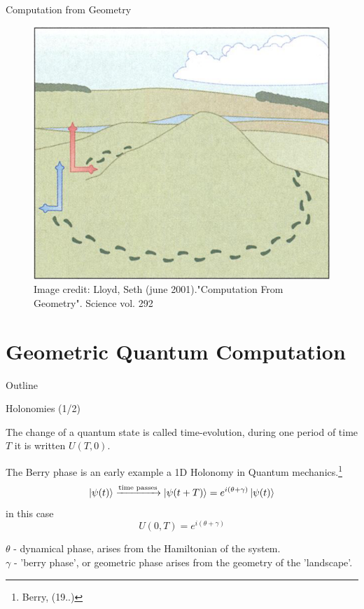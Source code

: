 \documentclass[t]{beamer}
\begin{document}
\begin{frame}{Computation from Geometry}

\begin{figure}
\begin{center}
\includegraphics[scale=0.25]{geom.png}
\captionsetup{labelformat=empty}
\caption{{\tiny Image credit: Lloyd, Seth (june 2001)."Computation From Geometry". Science vol. 292}}
\end{center}
\end{figure}


\end{frame}



\section{Geometric Quantum Computation}

\begin{frame}{Outline}
\tableofcontents[ 
currentsubsection, 
hideothersubsections, 
sectionstyle=show/shaded, 
subsectionstyle=show/shaded, 
] 
\end{frame}


\begin{frame}{Holonomies (1/2)}

The change of a quantum state is called time-evolution, during one period of time $T$ it is written $U(T,0)$.

The Berry phase is an early example a 1D Holonomy in Quantum mechanics.\footnote{\scriptsize Berry,  (19..)}
\begin{equation}
\ket{\psi(t)} \xrightarrow{\text{time passes}} \ket{\psi(t+T)} = e^{i(\theta + \gamma)}\ket{\psi(t)}
\end{equation}
in this case
\begin{equation}
U(0,T) = e^{i(\theta + \gamma)}
\end{equation}

$\theta$ - dynamical phase, arises from the Hamiltonian of the system.\\
$\gamma$ - 'berry phase', or geometric phase arises from the geometry of the 'landscape'.
\end{frame}
\end{document}

